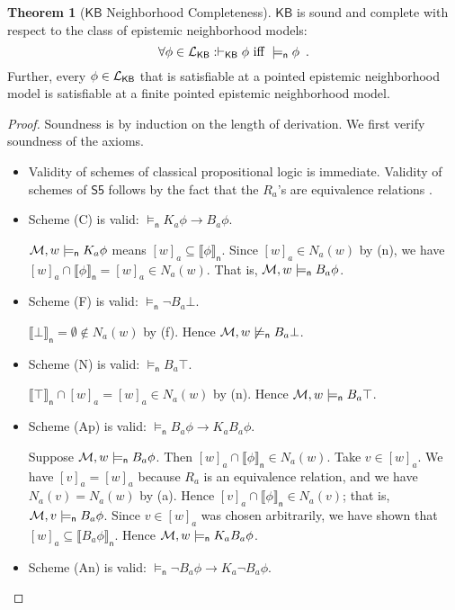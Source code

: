 \documentclass[12pt]{article}
\theoremstyle{definition}
\newtheorem{theorem}{Theorem}[section]
\newcommand{\M}{{\cal M}}      %
\newcommand{\Lang}{{\cal L}}   %
\newcommand{\KB}{{\mathsf{KB}}}                     %
\newcommand{\modelsn}{\models_{\mathsf{n}}}                  %
\newcommand{\semn}[1]{\llbracket{#1}\rrbracket_{\mathsf{n}}} %
\begin{document}
\begin{theorem}[$\KB$ Neighborhood Completeness]
  \label{theorem:KB-neighborhood-completeness}
  $\KB$ is sound and complete with respect to the class of epistemic
  neighborhood models:
  \[
  \forall\phi\in\Lang_\KB: \vdash_\KB\phi \text{ iff } {}\modelsn\phi
  \enspace.
  \]
  Further, every $\phi\in\Lang_\KB$ that is satisfiable at a pointed
  epistemic neighborhood model is satisfiable at a finite pointed
  epistemic neighborhood model.
\end{theorem}
\begin{proof}
  Soundness is by induction on the length of derivation.  We first
  verify soundness of the axioms.
  \begin{itemize}
  \item Validity of schemes of classical propositional logic is
    immediate.  Validity of schemes of $\mathsf{S5}$ follows by the
    fact that the $R_a$'s are equivalence relations
    \cite{BlaRijVen:ml}.

  \item Scheme (C) is valid: $\modelsn K_a\phi\to B_a\phi$.

    $\M,w\modelsn K_a\phi$ means $[w]_a\subseteq\semn{\phi}$.  Since
    $[w]_a\in N_a(w)$ by (n), we have $[w]_a\cap\semn{\phi}=[w]_a\in
    N_a(w)$.  That is, $\M,w\modelsn B_a\phi$.

  \item Scheme (F) is valid: $\modelsn\lnot B_a\bot$.

    $\semn{\bot}=\emptyset\notin N_a(w)$ by (f).  Hence
    $\M,w\not\modelsn B_a\bot$.

  \item Scheme (N) is valid: $\modelsn B_a\top$.

    $\semn{\top}\cap[w]_a=[w]_a\in N_a(w)$ by (n).  Hence
    $\M,w\modelsn B_a\top$.

  \item Scheme (Ap) is valid: $\modelsn B_a\phi\to K_a B_a\phi$.

    Suppose $\M,w\modelsn B_a\phi$. Then $[w]_a\cap\semn{\phi}\in
    N_a(w)$.  Take $v\in[w]_a$.  We have $[v]_a=[w]_a$ because $R_a$
    is an equivalence relation, and we have $N_a(v)=N_a(w)$ by (a).
    Hence $[v]_a\cap\semn{\phi}\in N_a(v)$; that is, $\M,v\modelsn
    B_a\phi$.  Since $v\in [w]_a$ was chosen arbitrarily, we have
    shown that $[w]_a\subseteq\semn{B_a\phi}$.  Hence $\M,w\modelsn
    K_a B_a\phi$.

  \item Scheme (An) is valid: $\modelsn \lnot B_a\phi\to K_a\lnot B_a\phi$.


\end{itemize}
\end{proof}
\end{document}
